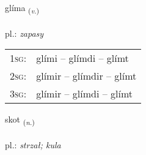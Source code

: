\documentclass[frontgrid, backgrid]{flacards}\usepackage[]{graphicx}\usepackage[]{xcolor}
\begin{document}
\renewcommand{\flhead}{\vskip5pt \fboxsep=0pt {\small\bfseries\footnotesize Sagnorð | czasownik}}
\renewcommand{\fcfoot}{\vskip5pt \fboxsep=0pt \hspace{2pt}{\small\bfseries\footnotesize 3K}}

\renewcommand{\blhead}{\vskip5pt {\small\bfseries\footnotesize Sagnorð | czasownik }}
\renewcommand{\bcfoot}{\vskip5pt \hspace{2pt}{\small\bfseries\footnotesize 3K}}


{glíma \small{\textsubscript{(\textit{v.})}} \\[1ex] %
\textphonetic{[kliːma]} \\
pl.: \emph{zapasy} \\  [2ex]
\renewcommand*{\arraystretch}{0.8}
\begin{tabular}{p{1cm}l}
\textsc{1sg}: & glími -- glímdi -- glímt \\ 
\textsc{2sg}: & glímir -- glímdir -- glímt \\ 
\textsc{3sg}: & glímir -- glímdi -- glímt \\ 
\end{tabular}
}

\renewcommand{\flhead}{\vskip5pt \fboxsep=0pt {\small\bfseries\footnotesize Nafnorð | rzeczownik}}
\renewcommand{\fcfoot}{\vskip5pt \fboxsep=0pt \hspace{2pt}{\small\bfseries\footnotesize 3K}}

\renewcommand{\blhead}{\vskip5pt {\small\bfseries\footnotesize Nafnorð | rzeczownik }}
\renewcommand{\bcfoot}{\vskip5pt \hspace{2pt}{\small\bfseries\footnotesize 3K}}


{skot \small{\textsubscript{(\textit{n.})}} \\[1ex] %
\textphonetic{[skɔːt]} \\
pl.: \emph{strzał; kula} \\  [2ex]
\renewcommand*{\arraystretch}{0.8}
}
\end{document}
